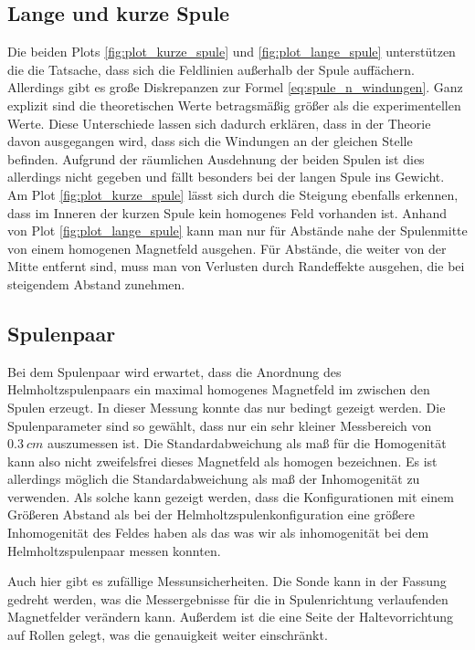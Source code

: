 \subsection{Lange und kurze Spule}
Die beiden Plots \ref{fig:plot_kurze_spule} und \ref{fig:plot_lange_spule} unterstützen die die Tatsache, 
dass sich die Feldlinien außerhalb der Spule auffächern.
Allerdings gibt es große Diskrepanzen zur Formel \eqref{eq:spule_n_windungen}.
Ganz explizit sind die theoretischen Werte betragsmäßig größer als die experimentellen Werte.
Diese Unterschiede lassen sich dadurch erklären, dass in der Theorie davon ausgegangen wird, dass sich die Windungen an der gleichen Stelle befinden.
Aufgrund der räumlichen Ausdehnung der beiden Spulen ist dies allerdings nicht gegeben und fällt besonders bei der langen Spule ins Gewicht.
Am Plot \ref{fig:plot_kurze_spule} lässt sich durch die Steigung ebenfalls erkennen, dass im Inneren der kurzen Spule kein homogenes Feld vorhanden ist.
Anhand von Plot \ref{fig:plot_lange_spule} kann man nur für Abstände nahe der Spulenmitte von einem homogenen Magnetfeld ausgehen.
Für Abstände, die weiter von der Mitte entfernt sind, muss man von Verlusten durch Randeffekte ausgehen, die bei steigendem Abstand zunehmen.


\subsection{Spulenpaar}
Bei dem Spulenpaar wird erwartet, dass die Anordnung des Helmholtzspulenpaars ein maximal homogenes Magnetfeld im zwischen  den Spulen erzeugt.
In dieser Messung konnte das nur bedingt gezeigt werden.
Die Spulenparameter sind so gewählt, dass nur ein sehr kleiner Messbereich von $\qty{0.3}{cm}$  auszumessen ist.
Die Standardabweichung als maß für die Homogenität kann also nicht zweifelsfrei dieses Magnetfeld als homogen bezeichnen.
Es ist allerdings möglich die Standardabweichung als maß der Inhomogenität zu verwenden. 
Als solche kann gezeigt werden, dass die Konfigurationen mit einem Größeren Abstand als bei der Helmholtzspulenkonfiguration
eine größere Inhomogenität des Feldes haben als das was wir als inhomogenität bei dem Helmholtzspulenpaar messen konnten.

Auch hier gibt es zufällige Messunsicherheiten.
Die Sonde kann in der Fassung gedreht werden, was die Messergebnisse für die in Spulenrichtung verlaufenden Magnetfelder verändern kann.
Außerdem ist die eine Seite der Haltevorrichtung auf  Rollen gelegt, was die genauigkeit weiter einschränkt.



